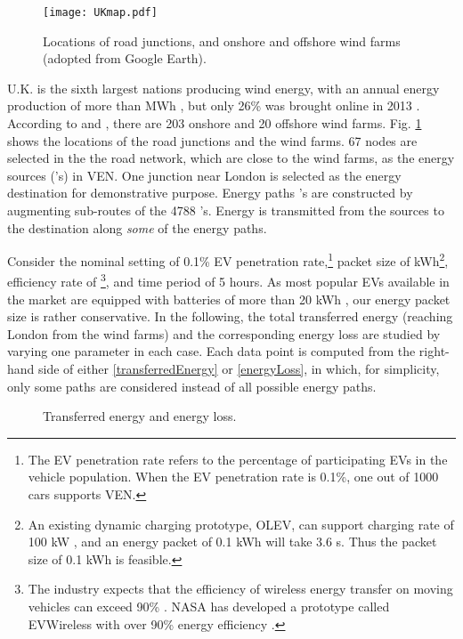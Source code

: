 \documentclass[journal]{IEEEtran}
\begin{document}
\begin{figure}[!t]
\centering
\texttt{[image: UKmap.pdf]} \vspace{-0.3cm}
\caption{Locations of road junctions, and onshore and offshore wind farms (adopted from Google Earth).}
\label{fig:UKmap}
\vspace{-0.2cm}
\end{figure}

U.K. is the sixth largest nations producing wind energy, with an annual energy
production of more than  MWh \cite{UKWindDB}, but only 26\% was brought online in 2013 \cite{UKWind}. According to \cite{offshore} and \cite{onshore}, there are 203 onshore and 20 offshore wind farms. Fig. \ref{fig:UKmap} shows the locations of the road junctions and the wind farms. 67 nodes are selected in the the road network, which are close to the wind farms, as the energy sources ('s) in VEN. One junction near London is selected as the energy destination  for demonstrative purpose. Energy paths 's are constructed by augmenting sub-routes of the 4788 's. Energy is transmitted from the sources to the destination along \textit{some} of the energy paths. 


Consider the nominal setting of  0.1\% EV penetration rate,\footnote{The EV penetration rate refers to the percentage of participating EVs in the vehicle population. When the EV penetration rate is 0.1\%, one out of 1000 cars supports VEN.} packet size  of  kWh\footnote{An existing dynamic charging prototype, OLEV, can support charging rate of 100 kW \cite{kaist}, and an energy packet of 0.1 kWh will take 3.6 s. Thus the packet size of 0.1 kWh is feasible.}, efficiency rate  of \footnote{The industry expects that the efficiency of wireless energy transfer on moving vehicles can exceed 90\% \cite{theengineer}. NASA has developed a prototype called EVWireless with over 90\% energy efficiency \cite{EVWireless}.}, and time period  of 5 hours.  As most popular EVs available in the market are equipped with batteries of more than 20 kWh \cite{batterycap}, our energy packet size is rather conservative. In the following, the total transferred energy (reaching London from the wind farms) and the corresponding energy loss are studied by varying one parameter in each case.  Each data point is computed from the right-hand side of either \eqref{transferredEnergy} or \eqref{energyLoss}, in which, for simplicity, only some paths are considered instead of all possible energy paths.


\begin{figure*}[!t]
	\begin{center}
	\end{center}
	\caption{Transferred energy and energy loss.}
  \label{fig:sim}
\end{figure*}
\end{document}
